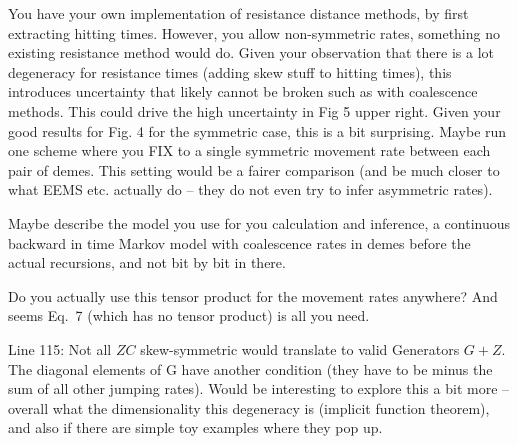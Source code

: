\reply{
}

\begin{point}{}
    You have your own implementation of resistance distance methods, by first
    extracting hitting times. However, you allow non-symmetric rates, something
    no existing resistance method would do. Given your observation that there
    is a lot degeneracy for resistance times (adding skew stuff to hitting
    times), this introduces uncertainty that likely cannot be broken such as
    with coalescence methods. This could drive the high uncertainty in Fig 5
    upper right. Given your good results for Fig. 4 for the symmetric case,
    this is a bit surprising. Maybe run one scheme where you FIX to a single
    symmetric movement rate between each pair of demes. This setting would be a
    fairer comparison (and be much closer to what EEMS etc. actually do -- they
    do not even try to infer asymmetric rates).
\end{point}



\begin{point}{}
    Maybe describe the model you use for you calculation and inference, a
    continuous backward in time Markov model with coalescence rates in demes
    before the actual recursions, and not bit by bit in there.
\end{point}


\begin{point}{\revref}
    Do you actually use this tensor product for the movement
    rates anywhere? And seems Eq.\ 7 (which has no tensor product) is all you
    need.
\end{point}


\begin{point}{Line 115:}
    Not all $ZC$ skew-symmetric would translate to valid Generators 
    $G + Z$. The diagonal elements of G have another condition (they have to be minus
    the sum of all other jumping rates). Would be interesting to explore this a
    bit more -- overall what the dimensionality this degeneracy is (implicit
    function theorem), and also if there are simple toy examples where they pop
    up.
\end{point}

